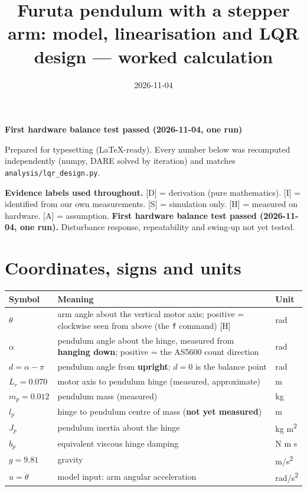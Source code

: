 \documentclass[11pt,a4paper]{article}
\title{Furuta pendulum with a stepper arm: model, linearisation and LQR design --- worked calculation}
\author{}
\date{2026-11-04}
\begin{document}
\maketitle
\begin{center}\textbf{First hardware balance test passed (2026-11-04, one run)}\end{center}

Prepared for typesetting (LaTeX-ready). Every number below was recomputed independently (numpy, DARE solved by iteration) and matches \texttt{analysis/lqr\_design.py}.

\textbf{Evidence labels used throughout.}
[D] = derivation (pure mathematics). [I] = identified from our own measurements. [S] = simulation only. [H] = measured on hardware. [A] = assumption. \textbf{First hardware balance test passed (2026-11-04, one run).} Disturbance response, repeatability and swing-up not yet tested.


\section{Coordinates, signs and units}

\begin{longtable}{p{}p{}p{}}\toprule
Symbol & Meaning & Unit \\
\midrule
$\theta$ & arm angle about the vertical motor axis; positive = clockwise seen from above (the \texttt{f} command) [H] & rad \\
$\alpha$ & pendulum angle about the hinge, measured from \textbf{hanging down}; positive = the AS5600 count direction & rad \\
$d=\alpha-\pi$ & pendulum angle from \textbf{upright}; $d=0$ is the balance point & rad \\
$L_r=0.070$ & motor axis to pendulum hinge (measured, approximate) & m \\
$m_p=0.012$ & pendulum mass (measured) & kg \\
$l_p$ & hinge to pendulum centre of mass (\textbf{not yet measured}) & m \\
$J_p$ & pendulum inertia about the hinge & kg m\textsuperscript{2} \\
$b_p$ & equivalent viscous hinge damping & N m s \\
$g=9.81$ & gravity & m/s\textsuperscript{2} \\
$u=\ddot\theta$ & model input: arm angular acceleration & rad/s\textsuperscript{2} \\
\bottomrule\end{longtable}
\end{document}
